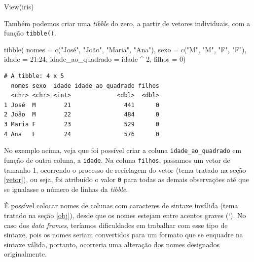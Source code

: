 \documentclass[
  brazilian,
]{book}
\newenvironment{Shaded}{\begin{snugshade}}{\end{snugshade}}
\newcommand{\AttributeTok}[1]{\textcolor[rgb]{0.77,0.63,0.00}{#1}}
\newcommand{\DecValTok}[1]{\textcolor[rgb]{0.00,0.00,0.81}{#1}}
\newcommand{\FunctionTok}[1]{\textcolor[rgb]{0.00,0.00,0.00}{#1}}
\newcommand{\NormalTok}[1]{#1}
\newcommand{\SpecialCharTok}[1]{\textcolor[rgb]{0.00,0.00,0.00}{#1}}
\newcommand{\StringTok}[1]{\textcolor[rgb]{0.31,0.60,0.02}{#1}}
\begin{document}
\begin{Shaded}
\begin{Highlighting}[]
\FunctionTok{View}\NormalTok{(iris)}
\end{Highlighting}
\end{Shaded}

Também podemos criar uma \emph{tibble} do zero, a partir de vetores individuais, com a função \texttt{tibble()}.

\begin{Shaded}
\begin{Highlighting}[]
\FunctionTok{tibble}\NormalTok{(}
  \AttributeTok{nomes =} \FunctionTok{c}\NormalTok{(}\StringTok{"José"}\NormalTok{, }\StringTok{"João"}\NormalTok{, }\StringTok{"Maria"}\NormalTok{, }\StringTok{"Ana"}\NormalTok{),}
  \AttributeTok{sexo =} \FunctionTok{c}\NormalTok{(}\StringTok{"M"}\NormalTok{, }\StringTok{"M"}\NormalTok{, }\StringTok{"F"}\NormalTok{, }\StringTok{"F"}\NormalTok{),}
  \AttributeTok{idade =} \DecValTok{21}\SpecialCharTok{:}\DecValTok{24}\NormalTok{,}
  \AttributeTok{idade\_ao\_quadrado =}\NormalTok{ idade }\SpecialCharTok{\^{}} \DecValTok{2}\NormalTok{,}
  \AttributeTok{filhos =} \DecValTok{0}\NormalTok{)}
\end{Highlighting}
\end{Shaded}

\begin{verbatim}
# A tibble: 4 x 5
  nomes sexo  idade idade_ao_quadrado filhos
  <chr> <chr> <int>             <dbl>  <dbl>
1 José  M        21               441      0
2 João  M        22               484      0
3 Maria F        23               529      0
4 Ana   F        24               576      0
\end{verbatim}

No exemplo acima, veja que foi possível criar a coluna \texttt{idade\_ao\_quadrado} em função de outra coluna, a \texttt{idade}. Na coluna \texttt{filhos}, passamos um vetor de tamanho 1, ocorrendo o processo de reciclagem do vetor (tema tratado na seção \ref{vetor}), ou seja, foi atribuído o valor \texttt{0} para todas as demais observações até que se igualasse o número de linhas da \emph{tibble}.

É possível colocar nomes de colunas com caracteres de sintaxe inválida (tema tratado na seção \ref{obj}), desde que os nomes estejam entre acentos graves (`). No caso dos \emph{data frames}, teríamos dificuldades em trabalhar com esse tipo de sintaxe, pois os nomes seriam convertidos para um formato que se enquadre na sintaxe válida, portanto, ocorreria uma alteração dos nomes designados originalmente.
\end{document}
